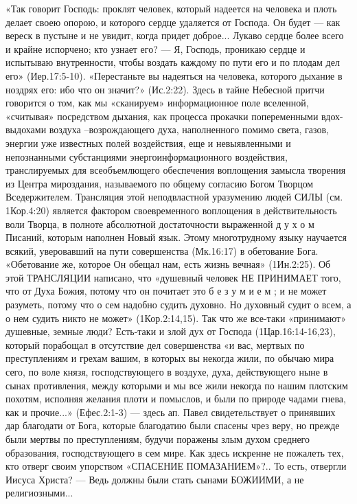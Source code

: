      «Так говорит Господь: проклят человек, который надеется на человека и плоть делает своею опорою, и которого сердце удаляется от Господа. Он будет --- как вереск в пустыне и не увидит, когда придет доброе... Лукаво сердце более всего и крайне испорчено; кто узнает его? --- Я, Господь, проникаю сердце и испытываю внутренности, чтобы воздать каждому по пути его и по плодам дел его» (Иер.17:5-10). «Перестаньте вы надеяться на человека, которого дыхание в ноздрях его: ибо что он значит?» (Ис.2:22).
     Здесь в тайне Небесной притчи говорится о том, как мы «сканируем» информационное поле вселенной, «считывая» посредством дыхания, как процесса прокачки попеременными вдох-выдохами воздуха –возрождающего духа, наполненного помимо света, газов, энергии уже известных полей воздействия, еще и невыявленными и непознанными субстанциями энергоинформационного воздействия, транслируемых для всеобъемлющего обеспечения воплощения замысла творения из Центра мироздания, называемого по общему согласию Богом Творцом Вседержителем.  Трансляция этой неподвластной уразумению людей СИЛЫ (см. 1Кор.4:20) является фактором своевременного воплощения в действительность воли Творца, в полноте абсолютной достаточности выраженной  д у х о м  Писаний, которым наполнен Новый язык. Этому многотрудному языку научается всякий, уверовавший на пути совершенства (Мк.16:17) в обетование Бога. «Обетование же, которое Он обещал нам, есть жизнь вечная» (1Ин.2:25).
     Об этой ТРАНСЛЯЦИИ написано, что «душевный человек  НЕ  ПРИНИМАЕТ  того, что от Духа Божия, потому что он почитает это  б е з у м и е м ; и не может разуметь, потому что о сем надобно судить духовно. Но духовный судит о всем, а о нем судить никто не может» (1Кор.2:14,15).
                Так что же все-таки «принимают» душевные, земные люди?
Есть-таки и злой дух от Господа (1Цар.16:14-16,23), который порабощал в отсутствие дел совершенства «и вас, мертвых по преступлениям и грехам вашим, в которых вы некогда жили, по обычаю мира сего, по воле князя, господствующего в воздухе, духа, действующего ныне в сынах противления, между которыми и мы все жили некогда по нашим плотским похотям, исполняя желания плоти и помыслов, и были по природе чадами гнева, как и прочие...» (Ефес.2:1-3) --- здесь ап. Павел свидетельствует о принявших дар благодати от Бога, которые благодатию были спасены чрез веру, но прежде были мертвы по преступлениям, будучи поражены злым духом среднего образования, господствующего в сем мире.
     Как здесь искренне не пожалеть тех, кто отверг своим упорством  «СПАСЕНИЕ ПОМАЗАНИЕМ»?.. То есть, отвергли Иисуса Христа? --- Ведь должны были стать сынами БОЖИИМИ, а не религиозными...
   
